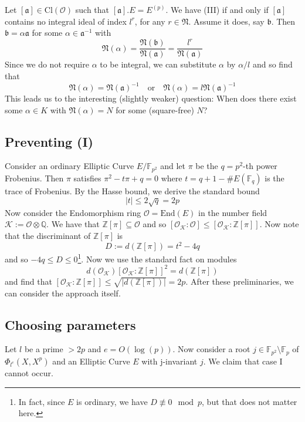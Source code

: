 \documentclass{scrartcl}
\newcommand{\N}{\mathbb{N}}
\newcommand{\Z}{\mathbb{Z}}
\newcommand{\F}{\mathbb{F}}
\newcommand{\End}{\mathrm{End}}
\newcommand{\Cl}{\mathrm{Cl}}
\newcommand{\K}{\mathcal{K}}
\renewcommand{\a}{\mathfrak{a}}
\renewcommand{\b}{\mathfrak{b}}
\renewcommand{\O}{\mathcal{O}}
\renewcommand{\N}{\mathfrak{N}}
\theoremstyle{definition}
\begin{document}
Let $[\a] \in \Cl(\O)$ such that $[\a].E = E^{(p)}$.
We have (III) if and only if $[\a]$ contains no integral ideal of index $l^r$, for any $r \in \N$.
Assume it does, say $\b$.
Then $\b = \alpha\a$ for some $\alpha \in \a^{-1}$ with
\begin{equation*}
    \N(\alpha) = \frac {\N(\b)} {\N(\a)} = \frac {l^r} {\N(\a)}
\end{equation*}
Since we do not require $\alpha$ to be integral, we can substitute $\alpha$ by $\alpha/l$ and so find that
\begin{equation*}
    \N(\alpha) = \N(\a)^{-1} \quad \text{or} \quad \N(\alpha) = l\N(\a)^{-1}
\end{equation*}
This leads us to the interesting (slightly weaker) question: When does there exist some $\alpha \in K$ with $\N(\alpha) = N$ for some (square-free) $N$?

\subsection{Preventing (I)}
Consider an ordinary Elliptic Curve $E/\F_{p^2}$ and let $\pi$ be the $q = p^2$-th power Frobenius.
Then $\pi$ satisfies $\pi^2 - t\pi + q = 0$ where $t = q + 1 - \#E(\F_q)$ is the trace of Frobenius.
By the Hasse bound, we derive the standard bound
\begin{equation*}
    |t| \leq 2\sqrt{q} = 2p
\end{equation*}
Now consider the Endomorphism ring $\O = \End(E)$ in the number field $\K := \O \otimes \mathbb{Q}$.
We have that $\Z[\pi] \subseteq \O$ and so $[\O_\K : \O] \leq [\O_\K : \Z[\pi]]$.
Now note that the discriminant of $\Z[\pi]$ is
\begin{equation*}
    D := d(\Z[\pi]) = t^2 - 4q
\end{equation*}
and so $-4q \leq D \leq 0$\footnote{In fact, since $E$ is ordinary, we have $D \not\equiv 0 \mod p$, but that does not matter here.}.
Now we use the standard fact on modules
\begin{equation*}
    d(\O_\K) [\O_\K : \Z[\pi]]^2 = d(\Z[\pi])
\end{equation*}
and find that $[\O_\K : \Z[\pi]] \leq \sqrt{|d(\Z[\pi])|} = 2p$.
After these preliminaries, we can consider the approach itself.

\subsection{Choosing parameters}
Let $l$ be a prime $> 2p$ and $e = O(\log(p))$.
Now consider a root $j \in \F_{p^2} \setminus \F_p$ of $\Phi_{l^e}(X, X^p)$ and an Elliptic Curve $E$ with j-invariant $j$.
We claim that case I cannot occur.
\end{document}
